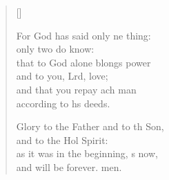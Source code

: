 \begin{verse}[\versewidth]
\begin{patverse}
For God has said only ne thing:\Med\\
only two do  know:\\
that to God alone blongs power\Med\\
and to you, Lrd, love;\\
and that you repay ach man\Med\\
according to h\pointup{\i}s deeds.

Glory to the Father and to th Son,\Med\\
and to the Hol Spirit:\\
as it was in the beginning, \pointup{\i}s now,\Med\\
and will be forever. men. 
  \end{patverse}
\end{verse}
